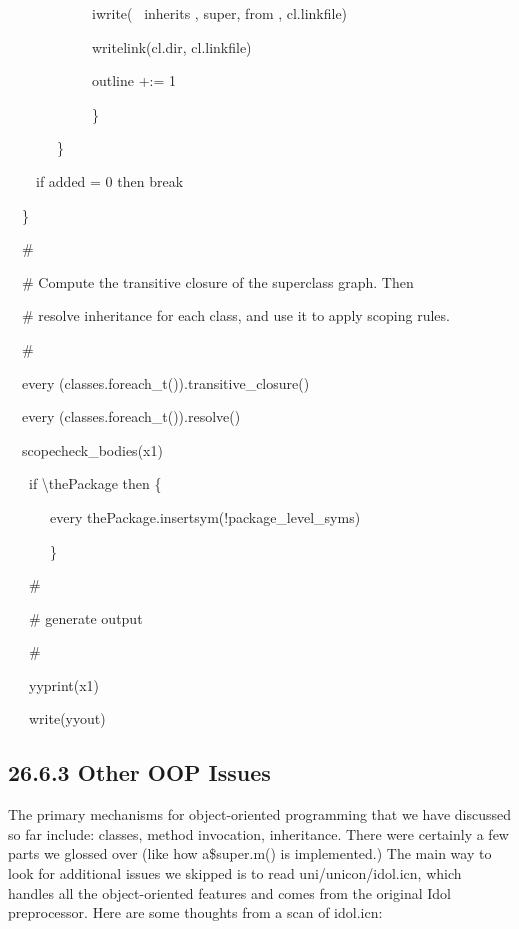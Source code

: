 {\ttfamily\mdseries
\ \ \ \ \ \ \ \ \ \ \ \ iwrite({\textquotedbl} \ inherits {\textquotedbl}, super, {\textquotedbl} from {\textquotedbl},
cl.linkfile)}

{\ttfamily\mdseries
\ \ \ \ \ \ \ \ \ \ \ \ writelink(cl.dir, cl.linkfile)}

{\ttfamily\mdseries
\ \ \ \ \ \ \ \ \ \ \ \ outline +:= 1}

{\ttfamily\mdseries
\ \ \ \ \ \ \ \ \ \ \ \ \}}

{\ttfamily\mdseries
\ \ \ \ \ \ \ \}}

{\ttfamily\mdseries
\ \ \ \ if added = 0 then break}

{\ttfamily\mdseries
\ \ \}}

{\ttfamily\mdseries
\ \ \#}

{\ttfamily\mdseries
\ \ \# Compute the transitive closure of the superclass graph. Then}

{\ttfamily\mdseries
\ \ \# resolve inheritance for each class, and use it to apply scoping rules.}

{\ttfamily\mdseries
\ \ \#}

{\ttfamily\mdseries
\ \ every (classes.foreach\_t()).transitive\_closure()}

{\ttfamily\mdseries
\ \ every (classes.foreach\_t()).resolve()}


\bigskip

{\ttfamily\mdseries
\ \ scopecheck\_bodies(x1)}


\bigskip

{\ttfamily\mdseries
\ \ \ if {\textbackslash}thePackage then \{}

{\ttfamily\mdseries
\ \ \ \ \ \ every thePackage.insertsym(!package\_level\_syms)}

{\ttfamily\mdseries
\ \ \ \ \ \ \}}


\bigskip

{\ttfamily\mdseries
\ \ \ \#}

{\ttfamily\mdseries
\ \ \ \# generate output}

{\ttfamily\mdseries
\ \ \ \#}

{\ttfamily\mdseries
\ \ \ yyprint(x1)}

{\ttfamily\mdseries
\ \ \ write(yyout)}

\subsection[26.6.3 Other OOP Issues]{26.6.3 Other OOP Issues}

The primary mechanisms for object-oriented programming that we have
discussed so far include: classes, method invocation,
inheritance. There were certainly a few parts we glossed over (like
how a\$super.m() is implemented.) The main way to look for additional
issues we skipped is to read uni/unicon/idol.icn, which handles all
the object-oriented features and comes from the original Idol
preprocessor. Here are some thoughts from a scan of idol.icn:


